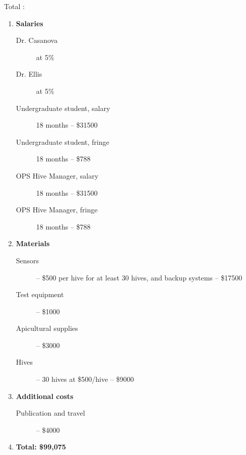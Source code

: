Total :
\begin{enumerate}
\item \textbf{Salaries}
\begin{description}
\item[Dr. Casanova] at 5\%
\item[Dr. Ellis] at 5\%
\item[Undergraduate student, salary] 18 months -- \$31500
\item[Undergraduate student, fringe] 18 months -- \$788
\item[OPS Hive Manager, salary] 18 months -- \$31500
\item[OPS Hive Manager, fringe] 18 months -- \$788
\end{description}
\item \textbf{Materials}
\begin{description}
\item[Sensors] -- \$500 per hive for at least 30 hives, and backup systems -- \$17500 
\item[Test equipment] -- \$1000 
\item[Apicultural supplies] -- \$3000
\item[Hives] -- 30 hives at \$500/hive -- \$9000
\end{description}
\item \textbf{Additional costs}
\begin{description}
\item[Publication and travel] -- \$4000
\end{description}\item \textbf{Total: \$99,075
} 
\end{enumerate}
